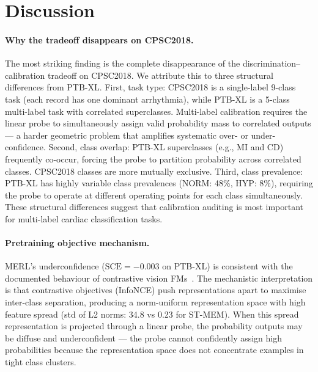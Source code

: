 \section{Discussion}
\label{sec:discussion}

\paragraph{Why the tradeoff disappears on CPSC2018.}
The most striking finding is the complete disappearance of the discrimination--calibration
tradeoff on CPSC2018. We attribute this to three structural differences from PTB-XL.
First, task type: CPSC2018 is a single-label 9-class task (each record has one dominant
arrhythmia), while PTB-XL is a 5-class multi-label task with correlated superclasses.
Multi-label calibration requires the linear probe to simultaneously assign valid probability
mass to correlated outputs --- a harder geometric problem that amplifies systematic
over- or under-confidence.
Second, class overlap: PTB-XL superclasses (e.g., MI and CD) frequently co-occur,
forcing the probe to partition probability across correlated classes. CPSC2018 classes
are more mutually exclusive.
Third, class prevalence: PTB-XL has highly variable class prevalences
(NORM: 48\%, HYP: 8\%), requiring the probe to operate at different operating points
for each class simultaneously. These structural differences suggest that calibration
auditing is most important for multi-label cardiac classification tasks.

\paragraph{Pretraining objective mechanism.}
MERL's underconfidence ($\text{SCE}=-0.003$ on PTB-XL) is consistent with the
documented behaviour of contrastive vision FMs~\citep{hekler2025beyond}. The mechanistic
interpretation is that contrastive objectives (InfoNCE) push representations apart to
maximise inter-class separation, producing a norm-uniform representation space with high
feature spread (std of L2 norms: 34.8 vs 0.23 for ST-MEM). When this spread representation
is projected through a linear probe, the probability outputs may be diffuse and underconfident
--- the probe cannot confidently assign high probabilities because the representation space
does not concentrate examples in tight class clusters.

